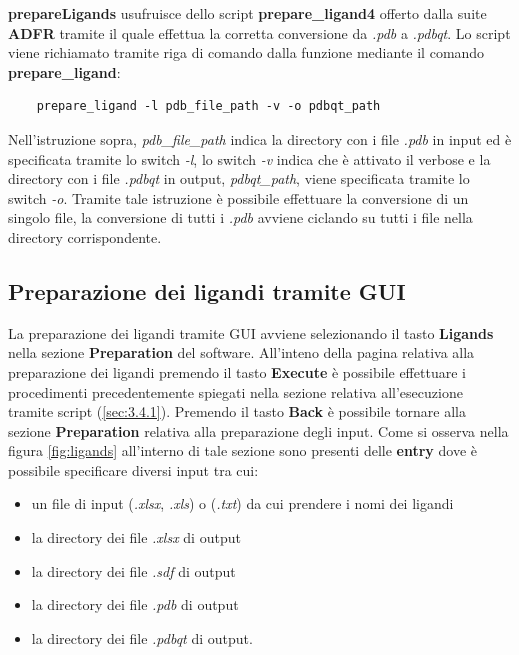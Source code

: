 \textbf{prepareLigands} usufruisce dello script \textbf{prepare\_ligand4} offerto dalla suite \textbf{ADFR} tramite il quale effettua la corretta conversione da \textit{.pdb} a \textit{.pdbqt}. Lo script viene richiamato tramite riga di comando dalla funzione mediante il comando \textbf{prepare\_ligand}:

\begin{verbatim}
    prepare_ligand -l pdb_file_path -v -o pdbqt_path
\end{verbatim}

Nell'istruzione sopra, \textit{pdb\_file\_path} indica la directory con i file \textit{.pdb} in input ed è specificata tramite lo switch \textit{-l}, lo switch \textit{-v} indica che è attivato il verbose e la directory con i file \textit{.pdbqt} in output, \textit{pdbqt\_path}, viene specificata tramite lo switch \textit{-o}. Tramite tale istruzione è possibile effettuare la conversione di un singolo file, la conversione di tutti i \textit{.pdb} avviene ciclando su tutti i file nella directory corrispondente.

\subsection{Preparazione dei ligandi tramite GUI}\label{sec:3.4.2}
La preparazione dei ligandi tramite GUI avviene selezionando il tasto \textbf{Ligands} nella sezione \textbf{Preparation} del software. All'inteno della pagina relativa alla preparazione dei ligandi premendo il tasto \textbf{Execute} è possibile effettuare i procedimenti precedentemente spiegati nella sezione relativa all'esecuzione tramite script (\ref{sec:3.4.1}). Premendo il tasto \textbf{Back} è possibile tornare alla sezione \textbf{Preparation} relativa alla preparazione degli input.
Come si osserva nella figura \ref{fig:ligands} all'interno di tale sezione sono presenti delle \textbf{entry} dove è possibile specificare diversi input tra cui:

\begin{itemize}
    \item un file di input (\textit{.xlsx}, \textit{.xls}) o (\textit{.txt}) da cui prendere i nomi dei ligandi
    \item la directory dei file \textit{.xlsx} di output
    \item la directory dei file \textit{.sdf} di output
    \item la directory dei file \textit{.pdb} di output
    \item la directory dei file \textit{.pdbqt} di output.
\end{itemize}


